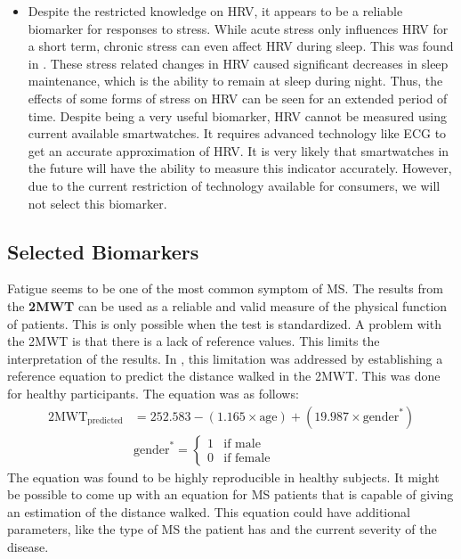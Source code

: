 \begin{itemize}
	\item Despite the restricted knowledge on HRV, it appears to be a reliable biomarker for responses to stress. 
	While acute stress only influences HRV for a short term, chronic stress can even affect HRV during sleep. 
	This was found in \cite{hall2004acute}. 
	These stress related changes in HRV caused significant decreases in sleep maintenance, which is the ability to remain at sleep during night.
	Thus, the effects of some forms of stress on HRV can be seen for an extended period of time. 
	Despite being a very useful biomarker, HRV cannot be measured using current available smartwatches.
	It requires advanced technology like ECG to get an accurate approximation of HRV.
	It is very likely that smartwatches in the future will have the ability to measure this indicator accurately.
	However, due to the current restriction of technology available for consumers, we will not select this biomarker.
\end{itemize}
%

\subsection{Selected Biomarkers}
Fatigue seems to be one of the most common symptom of MS.
The results from the \textbf{2MWT} can be used as a reliable and valid measure of the physical function of patients. 
This is only possible when the test is standardized.
A problem with the 2MWT is that there is a lack of reference values.
This limits the interpretation of the results.
In \cite{selman2014reference}, this limitation was addressed by establishing a reference equation to predict the distance walked in the 2MWT.
This was done for healthy participants.
The equation was as follows:
%
\begin{align*}
\text{2MWT}_{\text{predicted}} &= 252.583 - (1.165 \times \text{age}) + (19.987 \times \text{gender}^*) \\
& \text{gender}^* = 
\begin{cases*}
1 & \text{if } \text{male}\\
0 & \text{if } \text{female}
\end{cases*}
\end{align*}
%
The equation was found to be highly reproducible in healthy subjects.
It might be possible to come up with an equation for MS patients that is capable of giving an estimation of the distance walked. 
This equation could have additional parameters, like the type of MS the patient has and the current severity of the disease.

